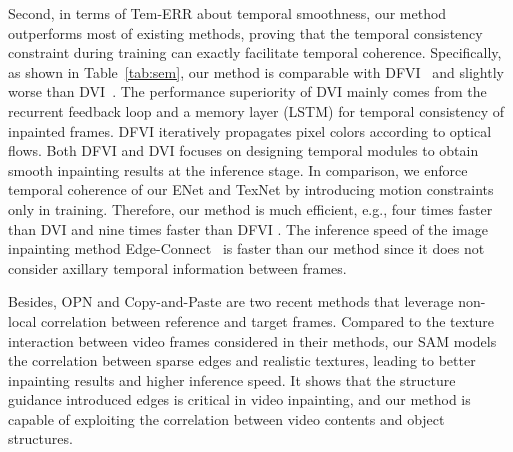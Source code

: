 {\color{blue}
Second, in terms of Tem-ERR about temporal smoothness, our method outperforms most of existing methods, proving that the temporal consistency constraint during training can exactly facilitate temporal coherence.
Specifically, as shown in Table~\ref{tab:sem}, our method is comparable with DFVI~\cite{Xu_2019_CVPR} and slightly worse than DVI~\cite{Kim_2019_CVPR1}.
%
The performance superiority of DVI mainly comes from the recurrent feedback loop and a memory layer (LSTM) for temporal consistency of inpainted frames. 
DFVI iteratively propagates pixel colors according to optical flows. Both DFVI and DVI focuses on designing temporal modules to obtain smooth inpainting results at the inference stage. In comparison, we enforce temporal coherence of our ENet and TexNet by introducing motion constraints only in training.}
Therefore, our method is much efficient, e.g., four times faster than DVI \cite{Kim_2019_CVPR1} and nine times faster than DFVI \cite{Xu_2019_CVPR}. 
The inference speed of the image inpainting method Edge-Connect~\cite{nazeri2019edgeconnect} is faster than our method since it does not consider axillary temporal information between frames. 



{\color{blue} Besides, OPN \cite{oh2019onion} and Copy-and-Paste \cite{lee2019copy} are two recent methods that leverage non-local correlation between reference and target frames.
Compared to the texture interaction between video frames considered in their methods, our SAM models the correlation between sparse edges and realistic textures, leading to better inpainting results and higher inference speed. It shows that the structure guidance introduced edges is critical in video inpainting, and our method is capable of exploiting the correlation between video contents and object structures. }
%

